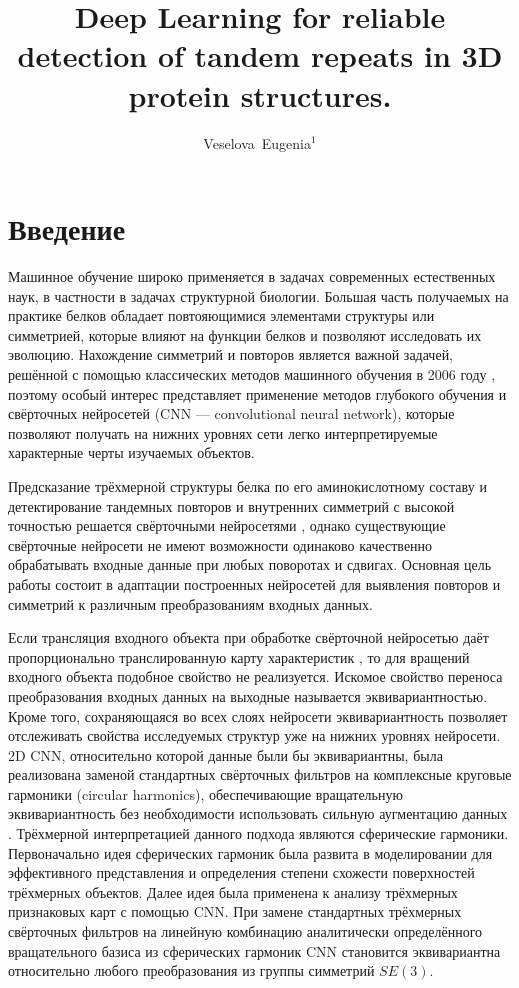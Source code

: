 \documentclass[12pt,twosides]{article}
\title
[Detection of tandem repeats in proteins]
{Deep Learning for reliable detection of tandem repeats in 3D protein structures.}
\author
[Veselova~Eugenia] 
{Veselova~Eugenia$^1$}
\begin{document}
	\maketitle
	
	\section{Введение}
	Машинное обучение широко применяется в задачах современных естественных наук, в частности в задачах структурной биологии. Большая часть получаемых на практике белков обладает повтояющимися элементами структуры или симметрией, которые влияют на функции белков и позволяют исследовать их эволюцию. Нахождение симметрий и повторов является важной задачей, решённой с помощью классических методов машинного обучения в 2006 году \cite{MitGuiPau06}, поэтому особый интерес представляет применение методов глубокого обучения и свёрточных нейросетей (CNN --- convolutional neural network), которые позволяют получать на нижних уровнях сети легко интерпретируемые характерные черты изучаемых объектов. 
	
	Предсказание трёхмерной структуры белка по его аминокислотному составу \cite{BioCNN18} и детектирование тандемных повторов и внутренних симметрий с высокой точностью решается свёрточными нейросетями \cite{DeepSymmetry18}, однако существующие свёрточные нейросети не имеют возможности одинаково качественно обрабатывать входные данные при любых поворотах и сдвигах. Основная цель работы состоит в адаптации построенных нейросетей для выявления повторов и симметрий к различным преобразованиям входных данных. 
	
	Если трансляция входного объекта при обработке свёрточной нейросетью даёт пропорционально транслированную карту характеристик \cite{Lenc18}, то для вращений входного объекта подобное свойство не реализуется. Искомое свойство переноса преобразования входных данных на выходные называется эквивариантностью. Кроме того, сохраняющаяся во всех слоях нейросети эквивариантность позволяет отслеживать свойства исследуемых структур уже на нижних уровнях нейросети. 2D CNN, относительно которой данные были бы эквивариантны, была реализована заменой стандартных свёрточных фильтров на комплексные круговые гармоники (circular harmonics), обеспечивающие вращательную эквивариантность без необходимости использовать сильную аугментацию данных \cite{conf/cvpr/WorrallGTB17}. Трёхмерной интерпретацией данного подхода являются сферические гармоники. Первоначально идея сферических гармоник была развита в моделировании для эффективного представления и определения степени схожести поверхностей трёхмерных объектов\cite{conf/siggraph/KazhdanF02, journals/cagd/MousaCAG08}. Далее идея была применена к анализу трёхмерных признаковых карт с помощью CNN. При замене стандартных трёхмерных свёрточных фильтров на линейную комбинацию аналитически определённого вращательного базиса из сферических гармоник CNN становится эквивариантна относительно любого преобразования из группы симметрий $SE(3)$\cite{DBLP:journals/corr/abs-1807-02547}.
	
\end{document}
